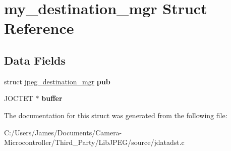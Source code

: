 \hypertarget{structmy__destination__mgr}{}\section{my\+\_\+destination\+\_\+mgr Struct Reference}
\label{structmy__destination__mgr}
\subsection*{Data Fields}
\begin{DoxyCompactItemize}
\item 
\mbox{\label{structmy__destination__mgr_a755405c3ce0d3ee7efdd305bf2b5995d}} 
struct \hyperlink{structjpeg__destination__mgr}{jpeg\+\_\+destination\+\_\+mgr} {\bfseries pub}
\item 
\mbox{\label{structmy__destination__mgr_ab52519326423db6890165ce4f4d3d818}} 
J\+O\+C\+T\+ET $\ast$ {\bfseries buffer}
\end{DoxyCompactItemize}


The documentation for this struct was generated from the following file\+:\begin{DoxyCompactItemize}
\item 
C\+:/\+Users/\+James/\+Documents/\+Camera-\/\+Microcontroller/\+Third\+\_\+\+Party/\+Lib\+J\+P\+E\+G/source/jdatadst.\+c\end{DoxyCompactItemize}

